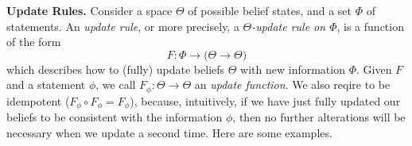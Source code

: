 \documentclass{article}
\begin{document}
\textbf{Update Rules.}
Consider a space $\Theta$
of possible belief states,
and a set $\Phi$ of statements.
An \emph{update rule}, or more precisely, a \emph{$\Theta$-update rule on $\Phi$},
is a function of the form
\[
    F :  \Phi \to \Big( \Theta \to \Theta \Big)
\]
which describes how to (fully) update beliefs $\Theta$ with new information $\Phi$.
Given $F$ and a statement $\phi$, we call $F_\phi : \Theta \to \Theta$ an \emph{update function}.
We also reqire to be idempotent ($F_\phi \circ F_\phi = F_\phi$),
because, intuitively, if we have just {fully} updated our beliefs to be consistent with the information $\phi$, then no further alterations will be necessary when we update a second time.
Here are some examples.
\end{document}
